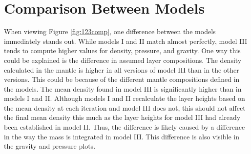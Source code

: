 \documentclass[twocolumn]{article}
\begin{document}
\section{Comparison Between Models}
When viewing Figure \ref{fig:123comp}, one difference between the models immediately stands out. While models I and II match almost perfectly, model III tends to compute higher values for density, pressure, and gravity. One way this could be explained is the difference in assumed layer compositions. The density calculated in the mantle is higher in all versions of model III than in the other versions. This could be because of the different mantle compositions defined in the models. The mean density found in model III is significantly higher than in models I and II. Although models I and II recalculate the layer heights based on the mean density at each iteration and model III does not, this should not affect the final mean density this much as the layer heights for model III had already been established in model II. Thus, the difference is likely caused by a difference in the way the mass is integrated in model III. This difference is also visible in the gravity and pressure plots.\\


\end{document}
